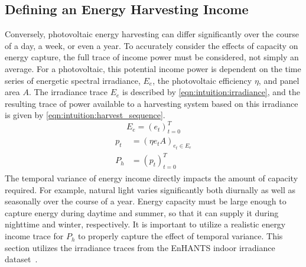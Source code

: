 
\subsection{Defining an Energy Harvesting Income}
Conversely, photovoltaic energy harvesting can differ significantly over the course of a day, a week, or even a year.
To accurately consider the effects of capacity on energy capture, the full trace of income power must be considered, not simply an average.
For a photovoltaic, this potential income power is dependent on the time series of energetic spectral irradiance, $E_e$, the photovoltaic efficiency $\eta$, and panel area $A$.
The irradiance trace $E_e$ is described by \cref{eqn:intuition:irradiance}, and the resulting trace of power available to a harvesting system based on this irradiance is given by \cref{eqn:intuition:harvest_sequence}.
\begin{equation}
    \label{eqn:intuition:irradiance}
    E_e = (e_t) ^ {T}_{t=0}
\end{equation}
\begin{align}
    \begin{split}
    p_t & = (\eta e_{t} A)_{e_t \in E_e}\\
    P_{h} &= (p_t) ^T _{t=0}
    \end{split}
    \label{eqn:intuition:harvest_sequence}
\end{align}
The temporal variance of energy income directly impacts the amount of capacity required.
For example, natural light varies significantly both diurnally as well as seasonally over the course of a year.
Energy capacity must be large enough to capture energy during daytime and summer, so that it can supply it during nighttime and winter, respectively.
It is important to utilize a realistic energy income trace for $P_h$ to properly capture the effect of temporal variance.
This section utilizes the irradiance traces from the EnHANTS indoor irradiance dataset~\cite{gorlatova2013networking}.
